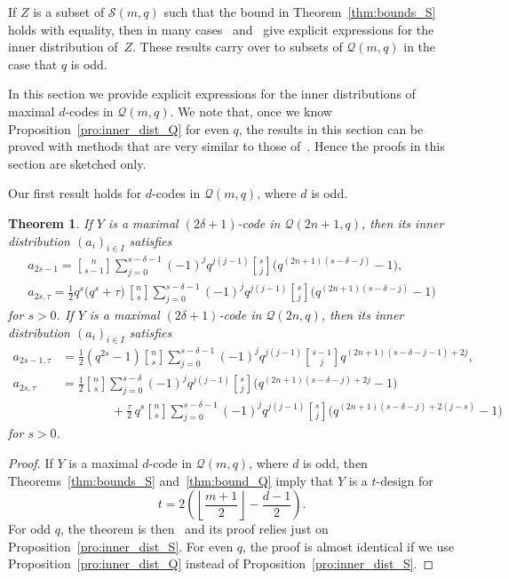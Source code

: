 \documentclass[10pt]{article}
\newtheorem{theorem}{Theorem}[section]
\theoremstyle{definition}
\newcommand{\Q}{\mathscr{Q}}
\renewcommand{\S}{\mathscr{S}}
\renewcommand{\d}{\delta}
\renewcommand{\t}{\tau}
\begin{document}
If $Z$ is a subset of $\S(m,q)$ such that the bound in Theorem~\ref{thm:bounds_S} holds with equality, then in many cases~\cite{Sch2010} and~\cite{Sch2015} give explicit expressions for the inner distribution of~$Z$. These results carry over to subsets of $\Q(m,q)$ in the case that $q$ is odd.
\par
In this section we provide explicit expressions for the inner distributions of maximal $d$-codes in $\Q(m,q)$. We note that, once we know Proposition~\ref{pro:inner_dist_Q} for even $q$, the results in this section can be proved with methods that are very similar to those of~\cite[Section~3.3]{Sch2015}. Hence the proofs in this section are sketched only.
\par
Our first result holds for $d$-codes in $\Q(m,q)$, where $d$ is odd.
\begin{theorem}
\label{thm:inner_dist_d_odd}
If $Y$ is a maximal $(2\d+1)$-code in $\Q(2n+1,q)$, then its inner distribution $(a_i)_{i\in I}$ satisfies
\begin{gather*}
a_{2s-1}=\genfrac{[}{]}{0pt}{}{n}{s-1}\sum_{j=0}^{s-\d-1}(-1)^jq^{j(j-1)}
\genfrac{[}{]}{0pt}{}{s}{j}\big(q^{(2n+1)(s-\d-j)}-1\big),\\%
a_{2s,\t}=\frac{1}{2}q^s\big(q^s+\t\big)\,\genfrac{[}{]}{0pt}{}{n}{s}\sum_{j=0}^{s-\d-1}(-1)^jq^{j(j-1)}\genfrac{[}{]}{0pt}{}{s}{j}\big(q^{(2n+1)(s-\d-j)}-1\big)
\end{gather*}
for $s>0$. If $Y$ is a maximal $(2\d+1)$-code in $\Q(2n,q)$, then its inner distribution $(a_i)_{i\in I}$ satisfies
\begin{align*}
a_{2s-1,\t}&=\frac{1}{2}(q^{2s}-1)\genfrac{[}{]}{0pt}{}{n}{s}\sum_{j=0}^{s-\d-1}(-1)^jq^{j(j-1)}\genfrac{[}{]}{0pt}{}{s-1}{j}q^{(2n+1)(s-\d-j-1)+2j},\\%
a_{2s,\t}&=\frac{1}{2}\genfrac{[}{]}{0pt}{}{n}{s}\sum_{j=0}^{s-\d}(-1)^jq^{j(j-1)}
\genfrac{[}{]}{0pt}{}{s}{j}\big(q^{(2n+1)(s-\d-j)+2j}-1\big)\\
&\qquad\qquad+\frac{\t}{2}\,q^s\genfrac{[}{]}{0pt}{}{n}{s}\sum_{j=0}^{s-\d-1}(-1)^jq^{j(j-1)}
\genfrac{[}{]}{0pt}{}{s}{j}\big(q^{(2n+1)(s-\d-j)+2(j-s)}-1\big)
\end{align*}
for $s>0$.
\end{theorem}
\begin{proof}
If $Y$ is a maximal $d$-code in $\Q(m,q)$, where $d$ is odd, then Theorems~\ref{thm:bounds_S} and~\ref{thm:bound_Q} imply that $Y$ is a $t$-design for
\[
t=2\left(\left\lfloor\frac{m+1}{2}\right\rfloor-\frac{d-1}{2}\right).
\]
For odd $q$, the theorem is then~\cite[Theorem~3.9]{Sch2015} and its proof relies just on Proposition~\ref{pro:inner_dist_S}. For even $q$, the proof is almost identical if we use Proposition~\ref{pro:inner_dist_Q} instead of Proposition~\ref{pro:inner_dist_S}.
\end{proof}
\end{document}
